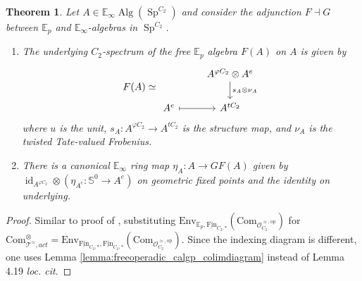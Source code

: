 \documentclass{article}
\DeclareMathOperator{\Alg}{Alg}
\DeclareMathOperator{\id}{id} %
\DeclareMathOperator{\Spectra}{Sp} %
\newcommand{\EE}{\mathbb{E}}
\newcommand{\op}{\mathrm{op}}
\newcommand{\Fin}{\mathrm{Fin}} %
\newtheorem{theorem}[equation]{Theorem}
\theoremstyle{definition}
\begin{document}
\begin{theorem}\label{thm:free_operadic_calgp_formula}
    Let $ A \in \EE_\infty\Alg\left(\Spectra^{C_2}\right) $ and consider the adjunction $ F \dashv G $ between $ \EE_p $ and $ \EE_\infty $-algebras in $ \Spectra^{C_2} $. %
    \begin{enumerate}[label=(\arabic*)]
    \item The underlying $ C_2 $-spectrum of the free $ \EE_p $ algebra $ F(A) $ on $ A $ is given by 
    \begin{equation}\label{eq:free_operadic_calgp_formula}
    F(A) \simeq
    \begin{tikzcd}
        &  A^{\varphi C_2} \otimes A^e \ar[d,"{s_A \otimes \nu_A}"] \\
        A^e \ar[r,mapsto] & A^{tC_2}
    \end{tikzcd}
    \end{equation}
    where $ u $ is the unit, $ s_A : A^{\varphi C_2} \to A^{tC_2} $ is the structure map, and $ \nu_A $ is the twisted Tate-valued Frobenius. 
    \item There is a canonical $ \EE_\infty $ ring map $ \eta_A \colon A \to GF(A) $ given by $ \id_{A^{\varphi C_2}} \otimes (\eta_{A^e}:\mathbb{S}^0 \to A^e) $ on geometric fixed points and the identity on underlying.
    \end{enumerate}
\end{theorem}
\begin{proof}
    Similar to proof of \cite[Theorem 4.15]{LYang_normedrings}, substituting $ \mathrm{Env}_{\EE_p, \underline{\Fin}_{C_2,*}}\left(\mathrm{Com}_{\mathcal{O}_{C_2}^{\simeq,\op}}\right) $ for $ \mathrm{Com}_{\mathcal{T}^\simeq,act}^\otimes = \mathrm{Env}_{\underline{\Fin}_{C_2,*}, \underline{\Fin}_{C_2,*}}\left(\mathrm{Com}_{\mathcal{O}_{C_2}^{\simeq,\op}}\right) $. 
    Since the indexing diagram is different, one uses Lemma \ref{lemma:freeoperadic_calgp_colimdiagram} instead of Lemma 4.19 \emph{loc. cit}. 
\end{proof}
\end{document}
